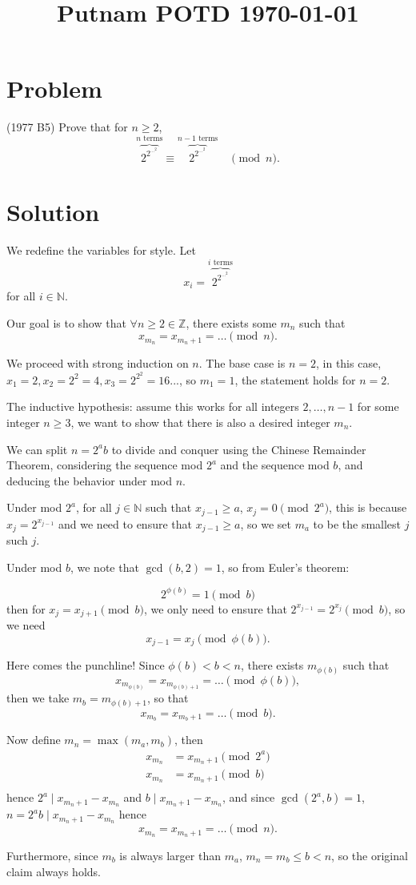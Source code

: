 \documentclass[amssymb,pra,12pt,aps,notitlepage]{revtex4-1}
\begin{document}
\title{Putnam POTD \today}
\maketitle

\section{Problem}
(1977 B5)
Prove that for $n\geq 2$,
\[
\overbrace{2^{2^{\cdots^{2}}}}^{\mbox{$n$ terms}} \equiv
\overbrace{2^{2^{\cdots^{2}}}}^{\mbox{$n-1$ terms}} \quad \pmod{n}.
\]

\section{Solution}
We redefine the variables for style. Let 
\[x_i = \overbrace{2^{2^{\cdots^{2}}}}^{\mbox{$i$ terms}}\]
for all $i \in \mathbb{N}$.

Our goal is to show that $\forall n \ge 2 \in \mathbb{Z}$, 
there exists some $m_n$ such that 
\[x_{m_n} = x_{m_n+1} = \dots \pmod{n}.\]

We proceed with strong induction on $n$. The base case 
is $n = 2$, in this case, 
$x_1 = 2, x_2 = 2^2 = 4, x_3 = 2^{2^2} = 16 ...$, 
so $m_1 = 1$, the statement holds for $n = 2$. 

The inductive hypothesis: assume this works for all integers $2, \dots, n-1$ 
for some integer $n \ge 3$, we want to show that there is also 
a desired integer $m_n$. 

We can split $n = 2^a b$ to divide and conquer using the Chinese Remainder Theorem,
considering the sequence mod $2^a$ and the sequence mod $b$, and deducing the 
behavior under mod $n$. 

Under mod $2^a$, for all $j \in \mathbb{N}$ such that $x_{j-1} \ge a$, $x_j = 0 \pmod{2^a}$,
this is because $x_j = 2^{x_{j-1}}$ and we need to ensure that 
$x_{j-1} \ge a$, so we set $m_a$ to be the smallest $j$ such $j$. 

Under mod $b$, we note that $\gcd(b,2) = 1$, so from Euler's theorem: 

\[2^{\phi(b)} = 1 \pmod{b}\]
then for $x_j = x_{j+1} \pmod{b}$, we only need to ensure that 
$2^{x_{j-1}} = 2^{x_{j}}\pmod{b}$, so we need 
\[x_{j-1} = x_j \pmod{\phi(b)}.\]

Here comes the punchline! Since $\phi(b) < b < n$, there exists 
$m_{\phi(b)}$ such that 
\[x_{m_{\phi(b)}} = x_{m_{\phi(b)+1}} = \dots \pmod{\phi(b)},\]
then 
we take $m_b = m_{\phi(b)+1}$, so that 
\[x_{m_b} = x_{m_b+1} = \dots \pmod{b
}.\]

Now define $m_n = \max(m_a,m_b)$, then 
\begin{align*}
    x_{m_n} &= x_{m_n+1} \pmod{2^a} \\ 
    x_{m_n} &= x_{m_n+1} \pmod{b} \\ 
\end{align*}
hence $2^a \mid x_{m_n+1} - x_{m_n}$ and $b \mid x_{m_n+1} - x_{m_n}$, and since $\gcd(2^a, b) = 1$, 
$n = 2^ab \mid x_{m_n+1} - x_{m_n}$
hence 
\[x_{m_n} = x_{m_n+1} = \dots \pmod{n}.\]


Furthermore, since $m_b$ is always larger than $m_a$, $m_n = m_b \le b < n$, so the original claim always holds.
\end{document}

